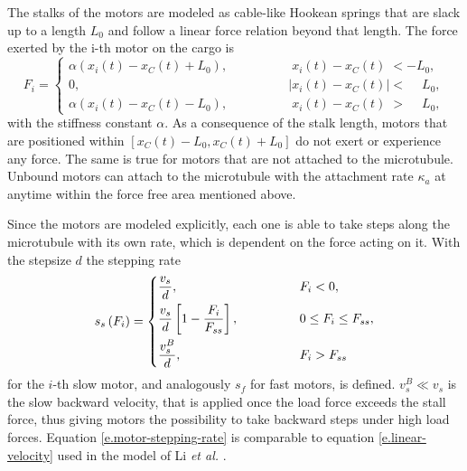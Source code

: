 The stalks of the motors are modeled as cable-like Hookean springs that are slack up to a length $L_0$ and follow a linear force relation beyond that length. The force exerted by the i-th motor
on the cargo is
\begin{equation}\label{e.motor-spring-relation}
 F_i =
 \begin{cases}
  \alpha \left(x_i\left(t\right) - x_{C}\left(t\right) + L_0\right), \qquad & \qquad \phantom{\vert}x_i\left(t\right) - x_{C}\left(t\right) \phantom{\vert} < -L_0, \\
  0,	& \qquad \vert x_i\left(t\right) - x_{C}\left(t\right) \vert < \phantom{-}L_0, \\
  \alpha \left(x_i\left(t\right) - x_{C}\left(t\right) - L_0\right), \qquad & \qquad \phantom{\vert}x_i\left(t\right) - x_{C}\left(t\right) \phantom{\vert} > \phantom{-}L_0,
 \end{cases}
\end{equation}
with the stiffness constant $\alpha$. As a consequence of the stalk length, motors that are positioned within \mbox{$\left[x_{C}\left(t\right) - L_0, x_{C}\left(t\right) + L_0\right]$} do
not exert or experience any force. The same is true for motors that are not attached to the microtubule.\\
Unbound motors can attach to the microtubule with the attachment rate $\kappa_a$ at anytime within the force free area mentioned above.

Since the motors are modeled explicitly, each one is able to take steps along the microtubule with its own rate, which is dependent on the force acting on it. With the stepsize $d$ the stepping
rate
\begin{equation}\label{e.motor-stepping-rate}
 s_s\left(F_i\right) =
 \begin{dcases}
  \dfrac{v_s}{d}, \qquad & \qquad F_i < 0, \\
  \dfrac{v_s}{d}\left[1 - \frac{F_i}{F_{ss}}\right], \qquad & \qquad 0 \leq F_i \leq F_{ss}, \\
  \dfrac{v_s^B}{d}, \qquad & \qquad F_i > F_{ss}
 \end{dcases}
\end{equation}
for the $i$-th slow motor, and analogously $s_f$ for fast motors, is defined. \mbox{$v_s^B \ll v_s$} is the slow backward velocity, that is applied once the load force exceeds the stall force, thus
giving motors the possibility to take backward steps under high load forces. Equation \eqref{e.motor-stepping-rate} is comparable to equation \eqref{e.linear-velocity} used in the model of Li
\textit{et al.} \cite{li}.

